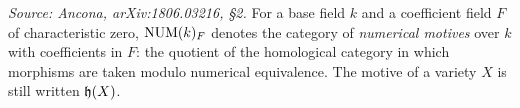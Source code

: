 \begin{definition}
  \label{def:num-motives}
  \textit{Source: Ancona, arXiv:1806.03216, §2.}
  For a base field \(k\) and a coefficient field \(F\) of characteristic zero,
  \(\mathrm{NUM}(k)_F\) denotes the category of \emph{numerical motives} over \(k\) with
  coefficients in \(F\): the quotient of the homological category in which
  morphisms are taken modulo numerical equivalence. The motive of a variety
  \(X\) is still written \(\mathfrak{h}(X)\).
\end{definition}

